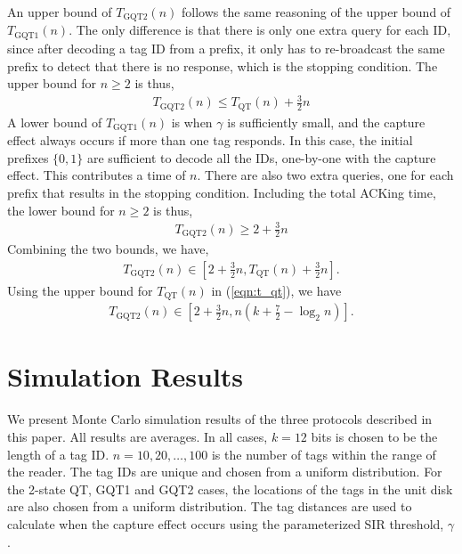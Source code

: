 \documentclass[conference]{IEEEtran}
\begin{document}
An upper bound of $T_{\mbox{GQT2}}\left(n\right)$ follows the same reasoning of the upper bound of  $T_{\mbox{GQT1}}\left(n\right)$.  The only difference is that there is only one extra query for each ID, since after decoding a tag ID from a prefix, it only has to re-broadcast the same prefix to detect that there is no response, which is the stopping condition.  The upper bound for $n\geq2$ is thus,
\begin{eqnarray}
T_{\mbox{GQT2}}\left(n\right) \leq T_{\mbox{QT}}\left(n\right) + \frac{3}{2} n \nonumber
\end{eqnarray}
A lower bound of $T_{\mbox{GQT1}}\left(n\right)$ is when $\gamma$ is sufficiently small, and the capture effect always occurs if more than one tag responds.  In this case, the initial prefixes $\{0, 1\}$ are sufficient to decode all the IDs, one-by-one with the capture effect.  This contributes a time of $n$.  There are also two extra queries, one for each prefix that results in the stopping condition.  Including the total ACKing time, the lower bound for $n\geq2$ is thus,
\begin{eqnarray}
T_{\mbox{GQT2}}\left(n\right) \geq 2 + \frac{3}{2} n \nonumber
\end{eqnarray}
Combining the two bounds, we have,
\begin{eqnarray}
T_{\mbox{GQT2}}\left(n\right) \in   \left[2 + \frac{3}{2} n, T_{\mbox{QT}}\left(n\right) + \frac{3}{2} n\right].
\label{eqn:t_gqt2_1}
\end{eqnarray}
Using the upper bound for $T_{\mbox{QT}}\left(n\right)$  in (\ref{eqn:t_qt}), we have
\begin{eqnarray}
T_{\mbox{GQT2}}\left(n\right) \in   \left[2 + \frac{3}{2} n, n \left( k + \frac{7}{2} - \log_2 n\right) \right].
\label{eqn:t_gqt2_2}
\end{eqnarray}

\section{Simulation Results}
\label{sec:sims}
We present Monte Carlo simulation results of the three protocols described in this paper.  All results are averages.  In all cases, $k=12$ bits is chosen to be the length of a tag ID.  $n = 10, 20, \ldots, 100$ is the number of tags within the range of the reader.  The tag IDs are unique and chosen from a uniform distribution.  For the  2-state QT, GQT1 and GQT2 cases, the locations of the tags in the unit disk are also chosen from a uniform distribution.  The tag distances are used to calculate when the capture effect occurs using the parameterized SIR threshold, $\gamma$.
\end{document}
